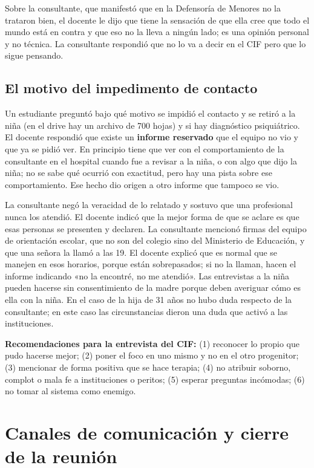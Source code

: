 \documentclass[12pt,oneside]{book}
\begin{document}
Sobre la consultante, que manifestó que en la Defensoría de Menores no la trataron bien, el docente le dijo que tiene la sensación de que ella cree que todo el mundo está en contra y que eso no la lleva a ningún lado; es una opinión personal y no técnica. La consultante respondió que no lo va a decir en el CIF pero que lo sigue pensando.

\subsection{El motivo del impedimento de contacto}

Un estudiante preguntó bajo qué motivo se impidió el contacto y se retiró a la niña (en el drive hay un archivo de 700 hojas) y si hay diagnóstico psiquiátrico. El docente respondió que existe un \textbf{informe reservado} que el equipo no vio y que ya se pidió ver. En principio tiene que ver con el comportamiento de la consultante en el hospital cuando fue a revisar a la niña, o con algo que dijo la niña; no se sabe qué ocurrió con exactitud, pero hay una pista sobre ese comportamiento. Ese hecho dio origen a otro informe que tampoco se vio.

La consultante negó la veracidad de lo relatado y sostuvo que una profesional nunca los atendió. El docente indicó que la mejor forma de que se aclare es que esas personas se presenten y declaren. La consultante mencionó firmas del equipo de orientación escolar, que no son del colegio sino del Ministerio de Educación, y que una señora la llamó a las 19. El docente explicó que es normal que se manejen en esos horarios, porque están sobrepasados; si no la llaman, hacen el informe indicando «no la encontré, no me atendió». Las entrevistas a la niña pueden hacerse sin consentimiento de la madre porque deben averiguar cómo es ella con la niña. En el caso de la hija de 31 años no hubo duda respecto de la consultante; en este caso las circunstancias dieron una duda que activó a las instituciones.

\begin{important}
\textbf{Recomendaciones para la entrevista del CIF:} (1) reconocer lo propio que pudo hacerse mejor; (2) poner el foco en uno mismo y no en el otro progenitor; (3) mencionar de forma positiva que se hace terapia; (4) no atribuir soborno, complot o mala fe a instituciones o peritos; (5) esperar preguntas incómodas; (6) no tomar al sistema como enemigo.
\end{important}

\section{Canales de comunicación y cierre de la reunión}
\end{document}
